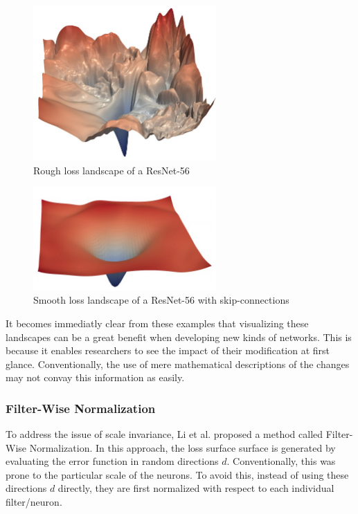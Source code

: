 \documentclass{acmsiggraph}               %
\begin{document}
\begin{figure}
\centering
\includegraphics[width=2.75in]{rough_loss}
\caption{Rough loss landscape of a ResNet-56 \protect\cite{Li2017}}
\label{fig:rough_loss}
\end{figure}

\begin{figure}
  \centering
  \includegraphics[width=2.75in]{smooth_loss}
  \caption{Smooth loss landscape of a ResNet-56 with skip-connections \protect\cite{Li2017,He2015}}
  \label{fig:smooth_loss}
\end{figure}

It becomes immediatly clear from these examples that visualizing these landscapes can be a great benefit when developing new kinds of networks. This is because it enables researchers to see the impact of their modification at first glance. Conventionally, the use of mere mathematical descriptions of the changes may not convay this information as easily.

\subsubsection{Filter-Wise Normalization}

To address the issue of scale invariance, Li et al. proposed a method called Filter-Wise Normalization. In this approach, the loss surface surface is generated by evaluating the error function in random directions $d$. Conventionally, this was prone to the particular scale of the neurons. To avoid this, instead of using these directions $d$ directly, they are first normalized with respect to each individual filter/neuron.
\end{document}
